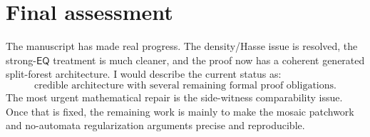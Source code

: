 \documentclass[11pt]{article}
\newcommand{\EQ}{\mathsf{EQ}}
\begin{document}
\section*{Final assessment}

The manuscript has made real progress.  The density/Hasse issue is resolved, the strong-$\EQ$ treatment is much cleaner, and the proof now has a coherent generated split-forest architecture.  I would describe the current status as:
\[
\boxed{\text{credible architecture with several remaining formal proof obligations.}}
\]
The most urgent mathematical repair is the side-witness comparability issue.  Once that is fixed, the remaining work is mainly to make the mosaic patchwork and no-automata regularization arguments precise and reproducible.
\end{document}
